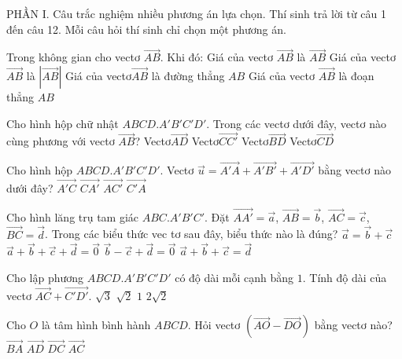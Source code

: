 PHẦN I. Câu trắc nghiệm nhiều phương án lựa chọn. Thí sinh trả lời từ câu 1 đến câu 12. Mỗi câu hỏi
thí sinh chỉ chọn một phương án.
\begin{ex}
	Trong không gian cho vectơ $\vec{AB}$. Khi đó:
	\choice
	{Giá của vectơ $\vec{AB}$ là $\vec{AB}$}
	{Giá của vectơ $\vec{AB}$ là $\left| \vec{AB} \right|$}
	{\True Giá của vectơ$\vec{AB}$ là đường thẳng $AB$}
	{Giá của vectơ $\vec{AB}$ là đoạn thẳng $AB$}
\end{ex}
\begin{ex}
	Cho hình hộp chữ nhật $ABCD.A'B'C'D'$. Trong các vectơ dưới đây, vectơ nào cùng phương với vectơ $\vec{AB}$?
	\choice
	{Vectơ$\vec{AD}$}
	{Vectơ$\vec{CC'}$}
	{Vectơ$\vec{BD}$}
	{\True Vectơ$\vec{CD}$}
\end{ex}
\begin{ex}
	Cho hình hộp $ABCD.A'B'C'D'$. Vectơ $\vec{u}=\vec{A'A}+\vec{A'B'}+\vec{A'D'}$ bằng vectơ nào dưới đây?
	\choice
	{\True $\vec{A'C}$}
	{$\vec{CA'}$}
	{$\vec{AC'}$}
	{$\vec{C'A}$}
\end{ex}
\begin{ex}
	Cho hình lăng trụ tam giác $ABC.A'B'C'$. Đặt $\vec{AA'}=\vec{a}$, $\vec{AB}=\vec{b}$, $\vec{AC}=\vec{c}$, $\vec{BC}=\vec{d}$. Trong các biểu thức vec tơ sau đây, biểu thức nào là đúng?
	\choice
	{$\vec{a}=\vec{b}+\vec{c}$}
	{$\vec{a}+\vec{b}+\vec{c}+\vec{d}=\vec{0}$}
	{\True $\vec{b}-\vec{c}+\vec{d}=\vec{0}$}
	{$\vec{a}+\vec{b}+\vec{c}=\vec{d}$}
\end{ex}
\begin{ex}
	Cho lập phương $ABCD.A'B'C'D'$ có độ dài mỗi cạnh bằng $1$. Tính độ dài của vectơ $\vec{AC}+\vec{C'D'}$.
	\choice
	{$\sqrt{3}$}
	{$\sqrt{2}$}
	{\True $1$}
	{$2\sqrt{2}$}
\end{ex}
\begin{ex}
	Cho $O$ là tâm hình bình hành $ABCD$. Hỏi vectơ $\left(\vec{AO}-\vec{DO}\right)$ bằng vectơ nào?
	\choice
	{$\vec{BA}$}
	{\True $\vec{AD}$}
	{$\vec{DC}$}
	{$\vec{AC}$}
\end{ex}
